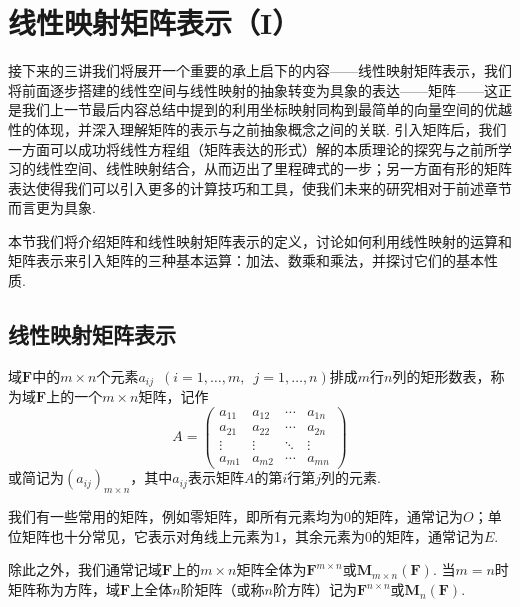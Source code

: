 \chapter{线性映射矩阵表示（I）}

接下来的三讲我们将展开一个重要的承上启下的内容——线性映射矩阵表示，我们将前面逐步搭建的线性空间与线性映射的抽象转变为具象的表达——矩阵——这正是我们上一节最后内容总结中提到的利用坐标映射同构到最简单的向量空间的优越性的体现，并深入理解矩阵的表示与之前抽象概念之间的关联. 引入矩阵后，我们一方面可以成功将线性方程组（矩阵表达的形式）解的本质理论的探究与之前所学习的线性空间、线性映射结合，从而迈出了里程碑式的一步；另一方面有形的矩阵表达使得我们可以引入更多的计算技巧和工具，使我们未来的研究相对于前述章节而言更为具象.

本节我们将介绍矩阵和线性映射矩阵表示的定义，讨论如何利用线性映射的运算和矩阵表示来引入矩阵的三种基本运算：加法、数乘和乘法，并探讨它们的基本性质.

\section{线性映射矩阵表示}

\begin{definition}
    域$\mathbf{F}$中的$m\times n$个元素$a_{ij}\enspace(i=1,\ldots,m,\enspace j=1,\ldots,n)$排成$m$行$n$列的矩形数表，称为域$\mathbf{F}$上的一个$m\times n$矩阵，记作
    \[A=\begin{pmatrix}
            a_{11} & a_{12} & \cdots & a_{1n} \\
            a_{21} & a_{22} & \cdots & a_{2n} \\
            \vdots & \vdots & \ddots & \vdots \\
            a_{m1} & a_{m2} & \cdots & a_{mn}
        \end{pmatrix}\]
    或简记为$(a_{ij})_{m\times n}$，其中$a_{ij}$表示矩阵$A$的第$i$行第$j$列的元素.
\end{definition}

我们有一些常用的矩阵，例如零矩阵，即所有元素均为0的矩阵，通常记为$O$；单位矩阵也十分常见，它表示对角线上元素为1，其余元素为0的矩阵，通常记为$E$.

除此之外，我们通常记域$\mathbf{F}$上的$m\times n$矩阵全体为$\mathbf{F}^{m\times n}$或$\mathbf{M}_{m\times n}(\mathbf{F})$. 当$m=n$时矩阵称为方阵，域$\mathbf{F}$上全体$n$阶矩阵（或称$n$阶方阵）记为$\mathbf{F}^{n\times n}$或$\mathbf{M}_n(\mathbf{F})$.

